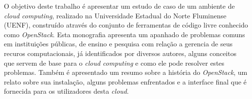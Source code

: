 \begin{resumo}
O objetivo deste trabalho é apresentar um estudo de caso de um ambiente de \emph{cloud computing},
realizado na Universidade Estadual do Norte Fluminense (UENF), construído através
do conjunto de ferramentas de código livre conhecido como \emph{OpenStack}. Esta
monografia apresenta um apanhado de problemas comuns em instituições públicas, de
ensino e pesquisa com relação a gerencia de seus recuros computacionais, já identificados por
diversos autores, alguns conceitos que servem de base para o \emph{cloud computing}
e como ele pode resolver estes problemas. Também é apresentado um resumo sobre a história
do \emph{OpenStack}, um relato sobre sua instalação, alguns problemas enfrentados
e a interface final que é fornecida para os utilizadores desta \emph{cloud}.
\end{resumo}

